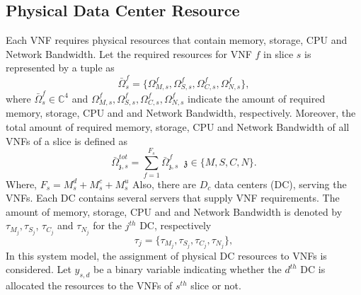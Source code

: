 \documentclass[conference]{IEEEtran}
\begin{document}
\subsection{Physical Data Center Resource}
Each VNF requires
physical resources that contain memory, storage, CPU and Network Bandwidth.
Let the required resources for VNF $f$ in slice $s$ is represented by a tuple as
\begin{equation}
\bar{\Omega}_{s}^f = \{\Omega_{M,{s}}^f, \Omega_{S,{s}}^f, \Omega_{C,{s}}^f, \Omega_{N,{s}}^f \},
\end{equation}
where $\bar{\Omega}_{s}^f\in \mathbb{C}^{4}$ and $\Omega_{M,{s}}^f, \Omega_{S,{s}}^f, \Omega_{C,{s}}^f, \Omega_{N,{s}}^f$ indicate the amount of required memory, storage, CPU and and Network Bandwidth, respectively.
Moreover, the total amount of required memory, storage, CPU and Network Bandwidth of all VNFs of a slice is defined as
\begin{equation}
\textstyle \bar{\Omega}_{\mathfrak{z},s}^{tot} = \sum_{f=1}^{F_s}\bar{\Omega}_{\mathfrak{z},s}^f \;\; \mathfrak{z} \in \{M, S, C, N\}.
\end{equation}
Where, $F_s = M_{s}^d + M_{s}^c + M_{s}^u$
Also, there are $D_c$ data centers (DC), serving the VNFs. Each DC contains several servers that supply VNF requirements.
The amount of memory, storage, CPU and and Network Bandwidth is denoted by $\tau_{M_{j}}, \tau_{S_{j}}$, $\tau_{C_{j}} $ and $\tau_{N_{j}} $ for the $j^{th}$ DC, respectively
\begin{equation*}
\tau_j = \{\tau_{M_{j}}, \tau_{S_{j}}, \tau_{C_{j}}, \tau_{N_{j}} \},
\end{equation*}
In this system model, the assignment of physical DC resources to VNFs is considered. Let $y_{s,d}$ be a binary variable indicating whether the $d^{th}$ DC is allocated the resources to the VNFs of $s^{th}$ slice or not.
\end{document}
